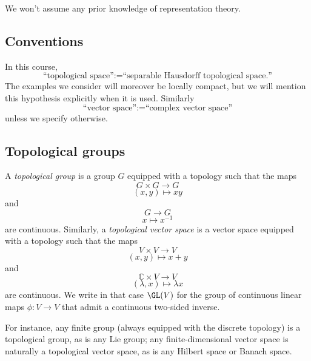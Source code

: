 \documentclass[reqno]{amsart} 
\begin{document}
We won't assume any prior knowledge of representation theory.

\subsection{Conventions}
In this course,
\begin{equation*}
  \text{``topological space''} := \text{``separable Hausdorff topological space.''}
\end{equation*}
The examples we consider will moreover be locally compact, but we will mention this hypothesis explicitly when it is used.  Similarly
\begin{equation*}
  \text{``vector space''} := \text{``complex vector space''}
\end{equation*}
unless we specify otherwise.

\subsection{Topological groups}
\begin{definition}
  A \emph{topological group} is a group $G$ equipped with a topology such that the maps
  \begin{equation*}
    G \times G \rightarrow G
  \end{equation*}
  \begin{equation*}
    (x,y) \mapsto x y
  \end{equation*}
  and
  \begin{equation*}
    G \rightarrow G
  \end{equation*}
  \begin{equation*}
    x \mapsto x^{-1}
  \end{equation*}
  are continuous.  Similarly, a \emph{topological vector space} is a vector space equipped with a topology such that the maps
  \begin{equation*}
    V \times V \rightarrow V
  \end{equation*}
  \begin{equation*}
    (x,y) \mapsto x + y
  \end{equation*}
  and
  \begin{equation*}
    \mathbb{C} \times V \rightarrow V
  \end{equation*}
  \begin{equation*}
    (\lambda,x) \mapsto \lambda x
  \end{equation*}
  are continuous.  We write in that case $\GL(V)$ for the group of continuous linear maps $\phi : V \rightarrow V$ that admit a continuous two-sided inverse.
\end{definition}
For instance, any finite group (always equipped with the discrete topology) is a topological group, as is any Lie group; any finite-dimensional vector space is naturally a topological vector space, as is any Hilbert space or Banach space.
\end{document}
